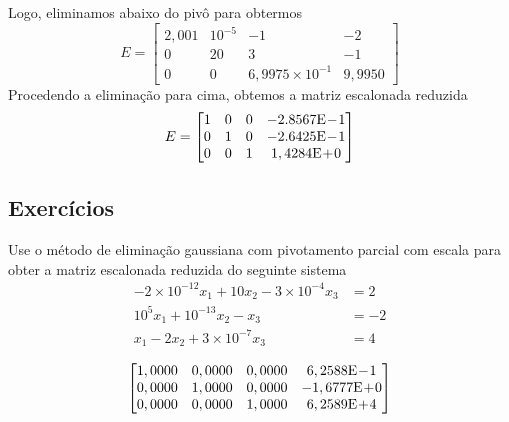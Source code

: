 \begin{ex}
\begin{equation}
  \end{equation}
  Logo, eliminamos abaixo do pivô para obtermos
  \begin{equation}
    E =
    \begin{bmatrix}
      2,001 & 10^{-5} & -1 & -2\\
      0 & 20 & 3 & -1\\
      0 & 0 & 6,9975\times 10^{-1} & 9,9950
    \end{bmatrix}
  \end{equation}
  Procedendo a eliminação para cima, obtemos a matriz escalonada reduzida
  \begin{equation}
    E =
    \begin{bmatrix}
      1 & 0 & 0 & -2.8567\mathrm{E}\!-\!1\\
      0 & 1 & 0 & -2.6425\mathrm{E}\!-\!1\\
      0 & 0 & 1 & 1,4284\mathrm{E}\!+\!0
    \end{bmatrix}
  \end{equation}

% 
\end{ex}

\subsection*{Exercícios}

\begin{exer}\label{exer:egauss_pivo_exec}
  Use o método de eliminação gaussiana com pivotamento parcial com escala para obter a matriz escalonada reduzida do seguinte sistema
  \begin{align}
    -2\times 10^{-12}x_1 + 10x_2 - 3\times 10^{-4}x_3 &= 2\\
    10^5x_1 + 10^{-13}x_2 - x_3 &= -2\\
    x_1 - 2x_2 + 3\times 10^{-7}x_3 &= 4
  \end{align}
\end{exer}
\begin{resp}
  $$
  \begin{bmatrix}
   1,0000 &  0,0000 &  0,0000 & 6,2588\mathrm{E}\!-\!1\\
   0,0000 &  1,0000 &  0,0000 & -1,6777\mathrm{E}\!+\!0\\
   0,0000 &  0,0000 &  1,0000 & 6,2589\mathrm{E}\!+\!4
  \end{bmatrix}
  $$
\end{resp}

